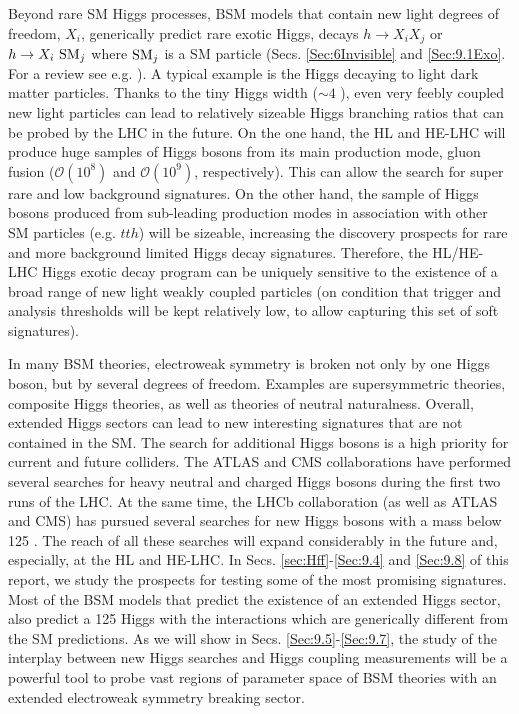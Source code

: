 Beyond rare SM Higgs processes, BSM models that contain new light degrees of freedom, $X_i$, generically predict rare exotic Higgs, decays $h\to X_i X_j$ or $h\to X_i ~{\rm{SM}}_j$ where ${\rm{SM}}_j$ is a SM particle (Secs. \ref{Sec:6Invisible} and \ref{Sec:9.1Exo}. For a review see e.g. \cite{Curtin:2013fra}). A typical example is the Higgs decaying to light dark matter particles. Thanks to the tiny Higgs width ($\sim 4$ \UMeV), even very feebly coupled new light particles can lead to relatively sizeable Higgs branching ratios that can be probed by the LHC in the future. On the one hand, the HL and HE-LHC will produce huge samples of Higgs bosons from its main production mode, gluon fusion ($\mathcal O(10^8)$ and $\mathcal O(10^9)$, respectively). This can allow the search for super rare and low background signatures. On the other hand, the sample of Higgs bosons produced from sub-leading  production modes in association with other SM particles (e.g. $tth$) will be sizeable, increasing the discovery prospects for rare and more background limited Higgs decay signatures. 
Therefore, the HL/HE-LHC Higgs exotic decay program can be uniquely sensitive to the existence of a broad range of new light weakly coupled particles (on condition that trigger and analysis thresholds will be kept relatively low, to allow capturing this set of soft signatures).


In many BSM theories, electroweak symmetry is broken not only by one Higgs boson, but by several degrees of freedom. Examples are supersymmetric theories, composite Higgs theories, as well as theories of neutral naturalness. Overall, extended Higgs sectors can lead to new interesting signatures that are not contained in the SM. The search for additional Higgs bosons is a high priority for current and future colliders. The ATLAS and CMS collaborations have performed several searches for heavy neutral and charged Higgs bosons during the first two runs of the LHC. At the same time, the LHCb collaboration (as well as ATLAS and CMS) has pursued several searches for new Higgs bosons with a mass below 125 \UGeV.  The reach of all these searches will expand considerably in the future and, especially, at the HL and HE-LHC. In Secs. \ref{sec:Hff}-\ref{Sec:9.4} and \ref{Sec:9.8} of this report, we study the prospects for testing some of the most promising signatures.
Most of the BSM models that predict the existence of an extended Higgs sector, also predict a 125 \UGeV Higgs with the interactions which are generically different from the SM predictions. As we will show in Secs. \ref{Sec:9.5}-\ref{Sec:9.7}, the study of the interplay between new Higgs searches and Higgs coupling measurements will be a powerful tool to probe vast regions of parameter space of BSM theories with an extended electroweak symmetry breaking sector.